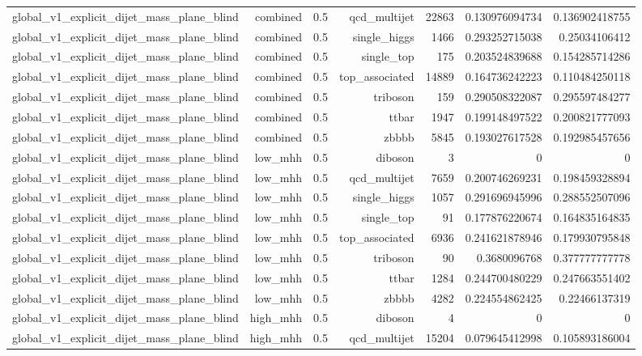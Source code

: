 \begin{table}[htbp]
{\begin{tabular}{lrrrrrr}
global\_v1\_explicit\_dijet\_mass\_plane\_blind & combined & 0.5 & qcd\_multijet & 22863 & 0.130976094734 & 0.136902418755 \\
global\_v1\_explicit\_dijet\_mass\_plane\_blind & combined & 0.5 & single\_higgs & 1466 & 0.293252715038 & 0.25034106412 \\
global\_v1\_explicit\_dijet\_mass\_plane\_blind & combined & 0.5 & single\_top & 175 & 0.203524839688 & 0.154285714286 \\
global\_v1\_explicit\_dijet\_mass\_plane\_blind & combined & 0.5 & top\_associated & 14889 & 0.164736242223 & 0.110484250118 \\
global\_v1\_explicit\_dijet\_mass\_plane\_blind & combined & 0.5 & triboson & 159 & 0.290508322087 & 0.295597484277 \\
global\_v1\_explicit\_dijet\_mass\_plane\_blind & combined & 0.5 & ttbar & 1947 & 0.199148497522 & 0.200821777093 \\
global\_v1\_explicit\_dijet\_mass\_plane\_blind & combined & 0.5 & zbbbb & 5845 & 0.193027617528 & 0.192985457656 \\
global\_v1\_explicit\_dijet\_mass\_plane\_blind & low\_mhh & 0.5 & diboson & 3 & 0 & 0 \\
global\_v1\_explicit\_dijet\_mass\_plane\_blind & low\_mhh & 0.5 & qcd\_multijet & 7659 & 0.200746269231 & 0.198459328894 \\
global\_v1\_explicit\_dijet\_mass\_plane\_blind & low\_mhh & 0.5 & single\_higgs & 1057 & 0.291696945996 & 0.288552507096 \\
global\_v1\_explicit\_dijet\_mass\_plane\_blind & low\_mhh & 0.5 & single\_top & 91 & 0.177876220674 & 0.164835164835 \\
global\_v1\_explicit\_dijet\_mass\_plane\_blind & low\_mhh & 0.5 & top\_associated & 6936 & 0.241621878946 & 0.179930795848 \\
global\_v1\_explicit\_dijet\_mass\_plane\_blind & low\_mhh & 0.5 & triboson & 90 & 0.3680096768 & 0.377777777778 \\
global\_v1\_explicit\_dijet\_mass\_plane\_blind & low\_mhh & 0.5 & ttbar & 1284 & 0.244700480229 & 0.247663551402 \\
global\_v1\_explicit\_dijet\_mass\_plane\_blind & low\_mhh & 0.5 & zbbbb & 4282 & 0.224554862425 & 0.22466137319 \\
global\_v1\_explicit\_dijet\_mass\_plane\_blind & high\_mhh & 0.5 & diboson & 4 & 0 & 0 \\
global\_v1\_explicit\_dijet\_mass\_plane\_blind & high\_mhh & 0.5 & qcd\_multijet & 15204 & 0.079645412998 & 0.105893186004 \\

\end{tabular}}
\end{table}
